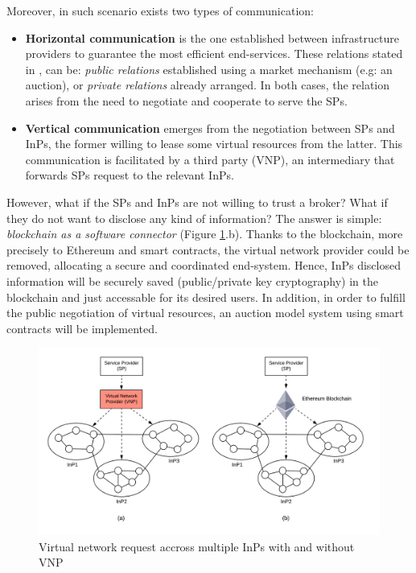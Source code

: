 Moreover, in such scenario exists two types of communication:
\begin{itemize}
	
	\item \textbf{Horizontal communication} is the one established between infrastructure providers to guarantee the most efficient end-services. These relations stated in \citep{zaheer2010multi}, can be: \textit{public relations} established using a market mechanism (e.g: an auction), or \textit{private relations} already arranged. In both cases, the relation arises from the need to negotiate and cooperate to serve the SPs.
	\item \textbf{Vertical communication} emerges from the negotiation between SPs and InPs, the former willing to lease some virtual resources from the latter. This communication is facilitated by a third party (VNP), an intermediary that forwards SPs request to the relevant InPs.
\end{itemize}

However, what if the SPs and InPs are not willing to trust a broker? What if they do not want to disclose any kind of information? The answer is simple: \textit{blockchain as a software connector} (Figure \ref{fig:multiprov}.b). Thanks to the blockchain, more precisely to Ethereum and smart contracts, the virtual network provider could be removed, allocating a secure and coordinated end-system. Hence, InPs disclosed information will be securely saved (public/private key cryptography) in the blockchain and just accessable for its desired users. In addition, in order to fulfill the public negotiation of virtual resources, an auction model system using smart contracts will be implemented.

\begin{figure}
	\includegraphics[width=1\linewidth]{gfx/multiprov.png}    
  \caption{Virtual network request accross multiple InPs with and without 	VNP \citep{dietrich2015multi}}
  \label{fig:multiprov}
\end{figure}


